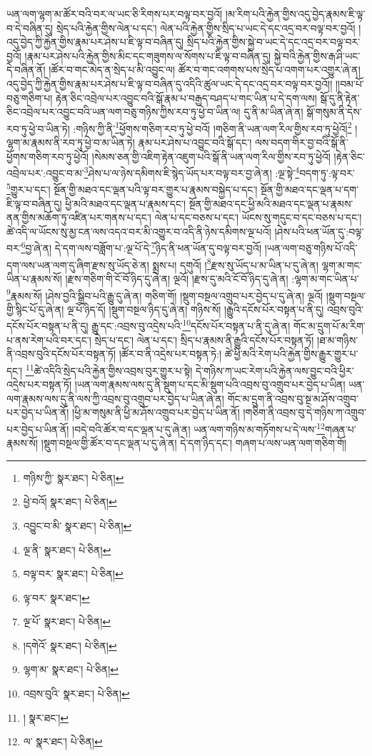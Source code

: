 ཡན་ལག་ལྷག་མ་ཚོར་བའི་བར་ལ་ཡང་ཅི་རིགས་པར་བལྟ་བར་བྱའོ། །མ་རིག་པའི་རྐྱེན་གྱིས་འདུ་བྱེད་རྣམས་ཇི་ལྟ་བ་དེ་བཞིན་དུ། སྲེད་པའི་རྐྱེན་གྱིས་ལེན་པ་དང་། ལེན་པའི་རྐྱེན་གྱིས་སྲིད་པ་ཡང་དེ་དང་འདྲ་བར་བལྟ་བར་བྱའོ། །འདུ་བྱེད་ཀྱི་རྐྱེན་གྱིས་རྣམ་པར་ཤེས་པ་ཇི་ལྟ་བ་བཞིན་དུ། སྲིད་པའི་རྐྱེན་གྱིས་སྐྱེ་བ་ཡང་དེ་དང་འདྲ་བར་བལྟ་བར་བྱའོ། །རྣམ་པར་ཤེས་པའི་རྐྱེན་གྱིས་མིང་དང་གཟུགས་ལ་སོགས་པ་ཇི་ལྟ་བ་བཞིན་དུ། སྐྱེ་བའི་རྐྱེན་གྱིས་རྒ་ཤི་ཡང་དེ་བཞིན་ནོ། །ཚོར་བ་གང་མེད་ན་སྲེད་པ་མི་འབྱུང་ལ། ཚོར་བ་གང་འགགས་པས་སྲེད་པ་འགག་པར་འགྱུར་ཞེ་ན། འདུ་བྱེད་ཀྱི་རྐྱེན་གྱིས་རྣམ་པར་ཤེས་པ་ཇི་ལྟ་བ་བཞིན་དུ་འདིའི་ཚུལ་ཡང་དེ་དང་འདྲ་བར་བལྟ་བར་བྱའོ།། །།བམ་པོ་བཅུ་གཅིག་པ། རྟེན་ཅིང་འབྲེལ་པར་འབྱུང་བའི་སྒོ་རྣམ་པ་བརྒྱད་བཤད་པ་གང་ཡིན་པ་དེ་དག་ལས། སྒོ་དུ་ནི་རྟེན་ཅིང་འབྲེལ་པར་འབྱུང་བའི་ཡན་ལག་བཅུ་གཉིས་ཀྱིས་རབ་ཏུ་ཕྱེ་བ་ཡིན་ལ། དུ་ནི་མ་ཡིན་ཞེ་ན། སྒོ་གསུམ་ནི་དེས་རབ་ཏུ་ཕྱེ་བ་ཡིན་ཏེ། :གཉིས་ཀྱི་ནི་\footnote{གཉིས་ཀྱི་  སྣར་ཐང་།  པེ་ཅིན། }ཕྱོགས་གཅིག་རབ་ཏུ་ཕྱེ་བའོ། །གཅིག་ནི་ཡན་ལག་རིལ་གྱིས་རབ་ཏུ་ཕྱེའོ།\footnote{ཕྱེ་བའོ།  སྣར་ཐང་།  པེ་ཅིན། } །ལྷག་མ་རྣམས་ནི་རབ་ཏུ་ཕྱེ་བ་མ་ཡིན་ཏེ། རྣམ་པར་ཤེས་པ་འབྱུང་བའི་སྒོ་དང་། ལས་བདག་གིར་བྱ་བའི་སྒོ་ནི་ཕྱོགས་གཅིག་རབ་ཏུ་ཕྱེའོ། །སེམས་ཅན་གྱི་འཇིག་རྟེན་འཇུག་པའི་སྒོ་ནི་ཡན་ལག་རིལ་གྱིས་རབ་ཏུ་ཕྱེའོ། །རྟེན་ཅིང་འབྲེལ་པར་:འབྱུང་བ་མ་\footnote{འབྱུང་བ་མི་  སྣར་ཐང་།  པེ་ཅིན། }ཤེས་པ་ལ་ཉེས་དམིགས་ཇི་སྙེད་ཡོད་པར་བལྟ་བར་བྱ་ཞེ་ན། :ལྔ་སྟེ་\footnote{ལྔ་ནི་  སྣར་ཐང་།  པེ་ཅིན། }བདག་ཏུ་:ལྟ་བར་\footnote{བལྟ་བར་  སྣར་ཐང་།  པེ་ཅིན། }གྱུར་པ་དང་། སྔོན་གྱི་མཐའ་དང་ལྡན་པའི་ལྟ་བར་གྱུར་པ་རྣམས་བསྐྱེད་པ་དང་། སྔོན་གྱི་མཐའ་དང་ལྡན་པ་དག་ཇི་ལྟ་བ་བཞིན་དུ། ཕྱི་མའི་མཐའ་དང་ལྡན་པ་རྣམས་དང་། སྔོན་གྱི་མཐའ་དང་ཕྱི་མའི་མཐའ་དང་ལྡན་པ་རྣམས་ནན་གྱིས་མཆོག་ཏུ་འཛིན་པར་གནས་པ་དང་། ལེན་པ་དང་བཅས་པ་དང་། ཡོངས་སུ་གདུང་བ་དང་བཅས་པ་དང་། ཚེ་འདི་ལ་ཡོངས་སུ་མྱ་ངན་ལས་འདའ་བར་མི་འགྱུར་བ་འདི་ནི་ཉེས་དམིགས་ལྔ་པའོ། །ཤེས་པའི་ཕན་ཡོན་དུ་:བལྟ་བར་\footnote{ལྟ་བར་  སྣར་ཐང་། }བྱ་ཞེ་ན། དེ་དག་ལས་བཟློག་པ་:ལྔ་པོ་དེ་\footnote{ལྔ་པོ་  སྣར་ཐང་།  པེ་ཅིན། }ཉིད་ནི་ཕན་ཡོན་དུ་བལྟ་བར་བྱའོ། །ཡན་ལག་བཅུ་གཉིས་པོ་འདི་དག་ལས་ཡན་ལག་དུ་ཞིག་རྫས་སུ་ཡོད་ཅེ་ན། སྨྲས་པ། དགུའོ། །\footnote{།དགེའོ་  སྣར་ཐང་།  པེ་ཅིན། }རྫས་སུ་ཡོད་པ་མ་ཡིན་པ་དུ་ཞེ་ན། ལྷག་མ་གང་ཡིན་པ་རྣམས་སོ། །རྫས་གཅིག་གི་ངོ་བོ་ཉིད་དུ་ཞེ་ན། ལྔའོ། །རྫས་དུ་མའི་ངོ་བོ་ཉིད་དུ་ཞེ་ན། :ལྷག་མ་གང་ཡིན་པ་\footnote{ལྷག་མ་  སྣར་ཐང་།  པེ་ཅིན། }རྣམས་སོ། །ཤེས་བྱའི་སྒྲིབ་པའི་རྒྱུ་དུ་ཞེ་ན། གཅིག་གོ། །སྡུག་བསྔལ་འགྲུབ་པར་བྱེད་པ་དུ་ཞེ་ན། ལྔའོ། །སྡུག་བསྔལ་གྱི་སྙིང་པོ་དུ་ཞེ་ན། ལྔ་པོ་ཉིད་དོ། །སྡུག་བསྔལ་ཉིད་དུ་ཞེ་ན། གཉིས་སོ། །རྒྱུའི་དངོས་པོར་བསྟན་པ་ནི་དུ། འབྲས་བུའི་དངོས་པོར་བསྟན་པ་ནི་དུ། རྒྱུ་དང་:འབྲས་བུ་འདྲེས་པའི་\footnote{འབྲས་བུའི་  སྣར་ཐང་།  པེ་ཅིན། }དངོས་པོར་བསྟན་པ་ནི་དུ་ཞེ་ན། གོང་མ་དྲུག་པོ་མ་རིག་པ་ནས་རེག་པའི་བར་དང་། སྲེད་པ་དང་། ལེན་པ་དང་། སྲིད་པ་རྣམས་ནི་རྒྱུའི་དངོས་པོར་བསྟན་ཏོ། །ཐ་མ་གཉིས་ནི་འབྲས་བུའི་དངོས་པོར་བསྟན་ཏོ། །ཚོར་བ་ནི་འདྲེས་པར་བསྟན་ཏེ:། ཚེ་ཕྱི་མའི་རེག་པའི་རྐྱེན་གྱིས་རྒྱུར་གྱུར་པ་དང་། \footnote{།    སྣར་ཐང་། }ཚེ་འདིའི་སྲེད་པའི་རྐྱེན་གྱིས་འབྲས་བུར་གྱུར་པ་སྟེ། དེ་གཉིས་ཀ་ཡང་རེག་པའི་རྐྱེན་ལས་བྱུང་བའི་ཕྱིར་འདྲེས་པར་བསྟན་ཏོ། །ཡན་ལག་རྣམས་ལས་དུ་ནི་སྡུག་པ་དང་མི་སྡུག་པའི་འབྲས་བུ་འགྲུབ་པར་བྱེད་པ་ཡིན། ཡན་ལག་རྣམས་ལས་དུ་ནི་ལས་ཀྱི་འབྲས་བུ་འགྲུབ་པར་བྱེད་པ་ཡིན་ཞེ་ན། གོང་མ་དྲུག་ནི་འབྲས་བུ་སྔ་མ་ཤོས་འགྲུབ་པར་བྱེད་པ་ཡིན་ནོ། །ཕྱི་མ་གསུམ་ནི་ཕྱི་མ་ཤོས་འགྲུབ་པར་བྱེད་པ་ཡིན་ནོ། །གཅིག་ནི་འབྲས་བུ་དེ་གཉིས་ཀ་འགྲུབ་པར་བྱེད་པ་ཡིན་ནོ། །བདེ་བའི་ཚོར་བ་དང་ལྡན་པ་དུ་ཞེ་ན། ཡན་ལག་གཉིས་མ་གཏོགས་པ་དེ་ལས་\footnote{ལ་  སྣར་ཐང་།  པེ་ཅིན། }གཞན་པ་རྣམས་སོ། །སྡུག་བསྔལ་གྱི་ཚོར་བ་དང་ལྡན་པ་དུ་ཞེ་ན། དེ་དག་ཉིད་དང་། གཞག་པ་ལས་ཡན་ལག་གཅིག་གོ། 